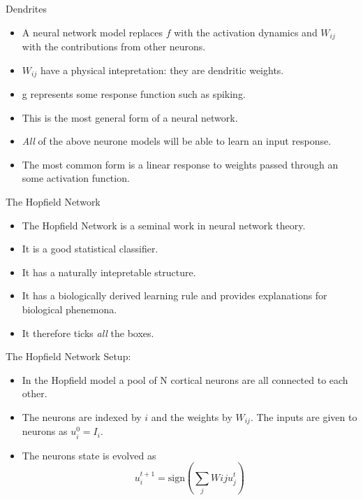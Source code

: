 \documentclass[
  ignorenonframetext,
]{beamer}
\begin{document}
\begin{frame}{Dendrites}
\protect\hypertarget{dendrites}{}
\begin{itemize}
\item
  A neural network model replaces \(f\) with the activation dynamics and
  \(W_{ij}\) with the contributions from other neurons.
\item
  \(W_{ij}\) have a physical intepretation: they are dendritic weights.
\item
  g represents some response function such as spiking.
\item
  This is the most general form of a neural network.
\item
  \emph{All} of the above neurone models will be able to learn an input
  response.
\item
  The most common form is a linear response to weights passed through an
  some activation function.
\end{itemize}
\end{frame}

\begin{frame}{The Hopfield Network}
\protect\hypertarget{the-hopfield-network}{}
\begin{itemize}
\item
  The Hopfield Network is a seminal work in neural network theory.
\item
  It is a good statistical classifier.
\item
  It has a naturally intepretable structure.
\item
  It has a biologically derived learning rule and provides explanations
  for biological phenemona.
\item
  It therefore ticks \emph{all} the boxes.
\end{itemize}
\end{frame}

\begin{frame}{The Hopfield Network Setup:}
\protect\hypertarget{the-hopfield-network-setup}{}
\begin{itemize}
\item
  In the Hopfield model a pool of N cortical neurons are all connected
  to each other.
\item
  The neurons are indexed by \(i\) and the weights by \(W_{ij}\). The
  inputs are given to neurons as \(u_i^0 = I_i\).
\item
  The neurons state is evolved as
  \[u_i^{t+1} = \text{sign}(\sum_j W{ij} u_j^t)\]
\end{itemize}
\end{frame}
\end{document}
